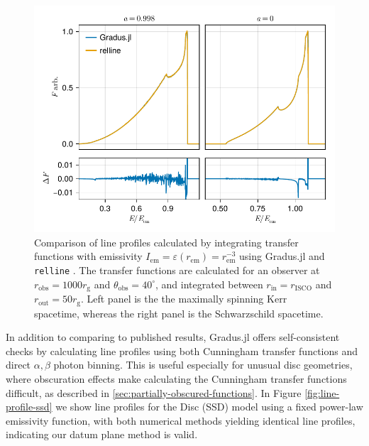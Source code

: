 \documentclass[fleqn,usenatbib]{mnras}
\newcommand{\Gradus}{Gradus.jl\xspace}
\newcommand{\relline}{\texttt{relline} }
\newcommand{\rg}{r_\text{g}}
\newcommand{\risco}{r_\text{ISCO}}
\newcommand{\rhoem}{r_\text{em}}
\begin{document}
\begin{figure}
    \centering
    \includegraphics[width=0.99\linewidth]{figures/lineprofiles.comparison.pdf}
    \caption{Comparison of line profiles calculated by integrating transfer functions with emissivity $I_\text{em} = \varepsilon(\rhoem) = \rhoem^{-3}$ using \Gradus and \relline. The transfer functions are calculated for an observer at $r_\text{obs} = 1000\rg$ and $\theta_\text{obs} = 40^\circ$, and integrated between $r_\text{in} = \risco$ and $r_\text{out} = 50 \rg$. Left panel is the the maximally spinning Kerr spacetime, whereas the right panel is the Schwarzschild spacetime.}
    \label{fig:relline-comparison}
\end{figure}

In addition to comparing to published results, \Gradus offers self-consistent
checks by calculating line profiles using both Cunningham transfer functions and
direct $\alpha, \beta$ photon binning. This is useful especially for unusual
disc geometries, where obscuration effects make calculating the Cunningham
transfer functions difficult, as described in
\ref{sec:partially-obscured-functions}. In Figure \ref{fig:line-profile-ssd} we
show line profiles for the \citet{shakura_black_1973} Disc (SSD) model using a fixed power-law emissivity
function, with both numerical methods yielding identical line profiles,
indicating our datum plane method is valid.
\end{document}

